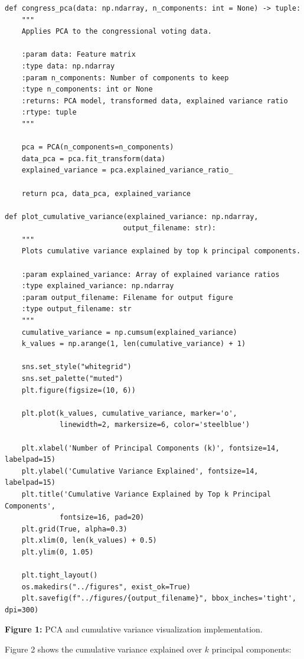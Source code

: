 \begin{verbatim}
def congress_pca(data: np.ndarray, n_components: int = None) -> tuple:
    """
    Applies PCA to the congressional voting data.
    
    :param data: Feature matrix
    :type data: np.ndarray
    :param n_components: Number of components to keep
    :type n_components: int or None
    :returns: PCA model, transformed data, explained variance ratio
    :rtype: tuple
    """
    
    pca = PCA(n_components=n_components)
    data_pca = pca.fit_transform(data)
    explained_variance = pca.explained_variance_ratio_
    
    return pca, data_pca, explained_variance

def plot_cumulative_variance(explained_variance: np.ndarray, 
                            output_filename: str):
    """
    Plots cumulative variance explained by top k principal components.
    
    :param explained_variance: Array of explained variance ratios
    :type explained_variance: np.ndarray
    :param output_filename: Filename for output figure
    :type output_filename: str
    """
    cumulative_variance = np.cumsum(explained_variance)
    k_values = np.arange(1, len(cumulative_variance) + 1)
    
    sns.set_style("whitegrid")
    sns.set_palette("muted")
    plt.figure(figsize=(10, 6))
    
    plt.plot(k_values, cumulative_variance, marker='o', 
             linewidth=2, markersize=6, color='steelblue')
    
    plt.xlabel('Number of Principal Components (k)', fontsize=14, labelpad=15)
    plt.ylabel('Cumulative Variance Explained', fontsize=14, labelpad=15)
    plt.title('Cumulative Variance Explained by Top k Principal Components', 
             fontsize=16, pad=20)
    plt.grid(True, alpha=0.3)
    plt.xlim(0, len(k_values) + 0.5)
    plt.ylim(0, 1.05)
    
    plt.tight_layout()
    os.makedirs("../figures", exist_ok=True)
    plt.savefig(f"../figures/{output_filename}", bbox_inches='tight', dpi=300)
\end{verbatim}

\begin{center}
\textbf{Figure 1:} PCA and cumulative variance visualization implementation.
\end{center}

Figure 2 shows the cumulative variance explained over $ k $ principal components:

